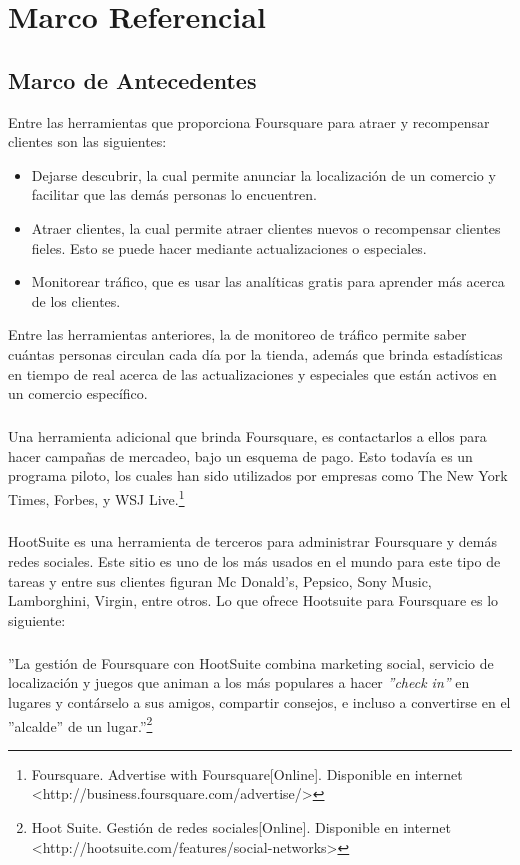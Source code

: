 \chapter{Marco Referencial}
\label{sec:marco}

\section{Marco de Antecedentes}
Entre las herramientas que proporciona Foursquare para atraer y recompensar clientes son las siguientes:
\begin{itemize}
\item Dejarse descubrir, la cual permite anunciar la localizaci\'on de un comercio y facilitar que las dem\'as personas lo encuentren.
\item Atraer clientes, la cual permite atraer clientes nuevos o recompensar clientes fieles. Esto se puede hacer mediante actualizaciones o especiales.
\item Monitorear tr\'afico, que es usar las anal\'iticas gratis para aprender m\'as acerca de los clientes.
\end{itemize}
Entre las herramientas anteriores, la de monitoreo de tr\'afico permite saber cu\'antas personas circulan cada d\'ia por la tienda, adem\'as que brinda estad\'isticas en tiempo de real acerca de  las actualizaciones y especiales que est\'an activos en un comercio espec\'ifico.
\paragraph{}
Una herramienta adicional que brinda Foursquare, es contactarlos a ellos para hacer campa\~nas de mercadeo, bajo un esquema de pago. Esto todav\'ia es un programa piloto, los cuales han sido utilizados por empresas como The New York Times, Forbes, y WSJ Live.\footnote{Foursquare. Advertise with Foursquare[Online]. Disponible en internet \textless http://business.foursquare.com/advertise/\textgreater}
\paragraph{}
HootSuite es una herramienta de terceros para administrar Foursquare y dem\'as redes sociales. Este sitio es uno de los m\'as usados en el mundo para este tipo de tareas y entre sus clientes figuran Mc Donald’s, Pepsico, Sony Music, Lamborghini, Virgin, entre otros. Lo que ofrece Hootsuite para Foursquare es lo siguiente:
\paragraph{}
''La gesti\'on de Foursquare con HootSuite combina marketing social, servicio de localizaci\'on y juegos que animan a los m\'as populares a hacer \textit{''check in''} en lugares y cont\'arselo a sus amigos, compartir consejos, e incluso a convertirse en el ''alcalde'' de un lugar.''\footnote{Hoot Suite. Gesti\'on de redes sociales[Online]. Disponible en internet \textless http://hootsuite.com/features/social-networks\textgreater}

